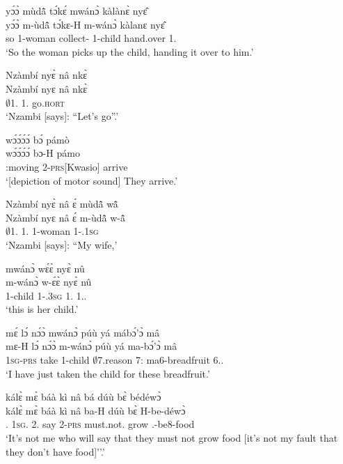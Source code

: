 \begin{exe}[(N234)]
\exN\label{n83}
  \glll yɔ́ɔ̀ mùdã̂ tɔ́kɛ́ mwánɔ̀ kàlànɛ̀ nyɛ̂ \\
       yɔ́ɔ̀ m-ùdã̂ tɔ́kɛ-H m-wánɔ̀ kàlanɛ nyɛ̂ \\
       so {\N}1-woman collect-{\R} {\N}1-child hand.over 1.{\OBJ}\\
    \trans `So the woman picks up the child, handing it over to him.'
 
\exN\label{n84}
  \glll Nzàmbí nyɛ̀ nâ nkɛ̀ \\
        Nzàmbí nyɛ nâ nkɛ̀ \\
       $\emptyset$1.{\PN}  1.{\SBJ} {\COMP} go.\textsc{hort}  \\
    \trans `Nzambi [says]: ``Let's go''.'
 
\exN\label{n85}
  \glll wɔ́ɔ́ɔ́ɔ́ bɔ́ pámò \\
        wɔ́ɔ́ɔ́ɔ́ bɔ-H pámo \\
       {\IDEO}:moving 2-\textsc{prs}[Kwasio] arrive  \\
    \trans `[depiction of motor sound] They arrive.'
 
\exN\label{n86}
  \glll Nzàmbí nyɛ̀ nâ ɛ́ mùdã̂ wã̂ \\
        Nzàmbí nyɛ nâ ɛ́ m-ùdã̂ w-ã̂ \\
       $\emptyset$1.{\PN}  1.{\SBJ}  {\COMP} {\LOC} {\N}1-woman 1-{\POSS}.1\textsc{sg}  \\
    \trans `Nzambi [says]: ``My wife,'
 
\exN\label{n87}
  \glll mwánɔ̀ wɛ́ɛ̀ nyɛ̀ nû \\
        m-wánɔ̀ w-ɛ́ɛ̀ nyɛ̀ nû \\
        {\N}1-child 1-{\POSS}.3\textsc{sg} 1.{\SBJ} 1.{\DEM}.{\PROX} \\
    \trans `this is her child.'
 
\exN\label{n88}
  \glll mɛ́ lɔ́ nɔ́ɔ̀ mwánɔ̀ púù yá mábɔ́'ɔ̀ mâ\\
        mɛ-H lɔ́ nɔ́ɔ̀ m-wánɔ̀ púù yá ma-bɔ́'ɔ̀ mâ\\
        1\textsc{sg}-\textsc{prs} {\RETRO}  take {\N}1-child $\emptyset$7.reason 7:{\ATT}  ma6-breadfruit 6.{\DEM}.{\PROX}\\
    \trans `I have just taken the child for these breadfruit.'

\exN\label{n89}
  \glll kálɛ̀ mɛ̀ báà kì nâ bá dúù bɛ̀ bédéwɔ̀\\
         kálɛ̀ mɛ̀ báà kì nâ ba-H dúù bɛ̀ H-be-déwɔ̀\\
       {\NEG}.{\FUT} 1\textsc{sg}.{\SBJ} 2.{\FUT} say {\COMP} 2-\textsc{prs} must.not.{\SBJV}  grow {\OBJ}.{\LINK}-be8-food\\
    \trans `It's not me who will say that they must not grow food [it's not my fault that they don't have food]''.'
 

\end{exe}
